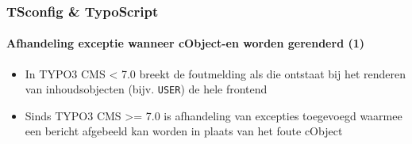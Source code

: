 
\begin{frame}[fragile]
	\frametitle{TSconfig \& TypoScript}
	\framesubtitle{Afhandeling exceptie wanneer cObject-en worden gerenderd (1)}

	\begin{itemize}
		\item In TYPO3 CMS < 7.0 breekt de foutmelding als die ontstaat bij het renderen van inhoudsobjecten (bijv. \texttt{USER}) de hele frontend
		\item Sinds TYPO3 CMS >= 7.0 is afhandeling van excepties toegevoegd waarmee een bericht afgebeeld kan worden in plaats van het foute cObject
	\end{itemize}

%

\end{frame}


